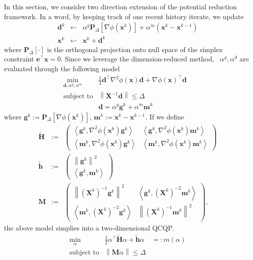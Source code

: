 \documentclass{article}
\newcommand{\assign}{:=}
\newcommand{\backassign}{=:}
\newcommand{\cdummy}{\cdot}
\newcommand{\x}{\mathbf{x}}
\newcommand{\0}{\textbf{0}}
\newcommand{\e}{\mathbf{e}}
\newcommand{\X}{\mathbf{X}}
\newcommand{\tmH}{\mathbf{H}}
\newcommand{\h}{\mathbf{h}}
\newcommand{\tmP}{\mathbf{P}}
\newcommand{\m}{\mathbf{m}}
\newcommand{\g}{\mathbf{g}}
\newcommand{\M}{\mathbf{M}}
\newcommand{\tmd}{\mathbf{d}}
\begin{document}
In this section, we consider two direction extension of the potential
reduction framework. In a word, by keeping track of one recent history
iterate, we update
\begin{eqnarray*}
  \tmd^k & \leftarrow & \alpha^g \tmP_{\Delta} \left[ \nabla \phi \left( \x^k
  \right) \right] + \alpha^m \left( \x^k - \x^{k - 1} \right)\\
  \x^k & \leftarrow & \x^k + \tmd^k
\end{eqnarray*}
where $\tmP_{\Delta} [\cdummy]$ is the orthogonal projection onto null space
of the simplex constraint $\e^{\top} \x = 0$. Since we leverage the
dimension-reduced method, \ $\alpha^g, \alpha^d$ are evaluated through the
following model
\begin{eqnarray*}
  \min_{\tmd, \alpha^g, \alpha^m} & \frac{1}{2} \tmd^{\top} \nabla^2 \phi
  \left( \x \right) \tmd + \nabla \phi \left( \x \right)^{\top} \tmd & \\
  \text{subject to} & \left\| \X^{- 1} \tmd \right\| \leq \Delta & \\
  & \tmd = \alpha^g \g^k + \alpha^m \m^k & 
\end{eqnarray*}
where $\g^k \assign \tmP_{\Delta} \left[ \nabla \phi \left( \x^k \right)
\right]$, $\m^k \assign \x^k - \x^{k - 1}$. If we define
\begin{eqnarray*}
  \widetilde{\tmH} & \assign & \left(\begin{array}{cc}
    \left\langle \g^k, \nabla^2 \phi \left( \x^k \right) \g^k \right\rangle &
    \left\langle \g^k, \nabla^2 \phi \left( \x^k \right) \m^k \right\rangle\\
    \left\langle \m^k, \nabla^2 \phi \left( \x^k \right) \g^k \right\rangle &
    \left\langle \m^k, \nabla^2 \phi \left( \x^k \right) \m^k \right\rangle
  \end{array}\right)\\
  \widetilde{\h} & \assign & \left(\begin{array}{c}
    \left\| \g^k \right\|^2\\
    \left\langle \g^k, \m^k \right\rangle
  \end{array}\right)\\
  \M & \assign & \left(\begin{array}{cc}
    \left\| \left( \X^k \right)^{- 1} \g^k \right\|^2 & \left\langle \g^k,
    \left( \X^k \right)^{- 2} \m^k \right\rangle\\
    \left\langle \m^k, \left( \X^k \right)^{- 2} \g^k \right\rangle & \left\|
    \left( \X^k \right)^{- 1} \m^k \right\|^2
  \end{array}\right),
\end{eqnarray*}
the above model simplies into a two-dimensional QCQP.
\begin{eqnarray*}
  \min_{\alpha} & \frac{1}{2} \alpha^{\top} \widetilde{\tmH} \alpha +
  \widetilde{\h} \alpha & \backassign m (\alpha)\\
  \text{subject to} & \left\| \M \alpha \right\| \leq \Delta & 
\end{eqnarray*}
\end{document}

